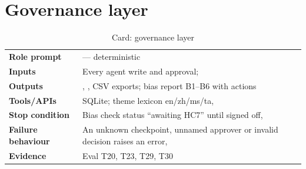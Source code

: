 \section{Governance layer}
\begin{table}[H]
\centering\footnotesize
\caption{Card: governance layer}
\label{tab:card-governance}
\begin{tabularx}{\textwidth}{>{\raggedright\arraybackslash}p{2.9cm}L}
\toprule
\textbf{Role prompt} &  --- deterministic \\
\textbf{Inputs} & Every agent write and approval;  \\
\textbf{Outputs} & , , CSV exports; bias report B1--B6 with actions \\
\textbf{Tools/APIs} & SQLite; theme lexicon en/zh/ms/ta,  \\
\textbf{Stop condition} & Bias check status ``awaiting HC7'' until signed off,  \\
\textbf{Failure behaviour} & An unknown checkpoint, unnamed approver or invalid decision raises an error,  \\
\textbf{Evidence} & Eval T20, T23, T29, T30 \\
\bottomrule
\end{tabularx}
\end{table}

